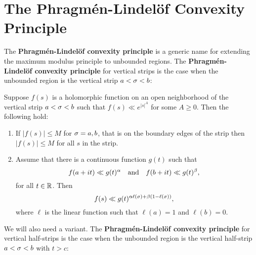   \section{The Phragm\'en-Lindel\"of Convexity Principle}\label{append:The_Phragmen_Lindelof_Convexity_principle}
    The \textbf{Phragm\'en-Lindel\"of convexity principle} is a generic name for extending the maximum modulus principle to unbounded regions. The \textbf{Phragm\'en-Lindel\"of convexity principle} for vertical strips is the case when the unbounded region is the vertical strip $a < \sigma < b$:

    \begin{theorem*}\label{thm:Phragmen-Lindelof_convexity_principle}
      Suppose $f(s)$ is a holomorphic function on an open neighborhood of the vertical strip $a < \sigma < b$ such that $f(s) \ll e^{|s|^{A}}$ for some $A \ge 0$. Then the following hold:
      \begin{enumerate}[label=(\roman*)]
        \item If $|f(s)| \le M$ for $\sigma = a,b$, that is on the boundary edges of the strip then $|f(s)| \le M$ for all $s$ in the strip.
        \item Assume that there is a continuous function $g(t)$ such that
        \[
          f(a+it) \ll g(t)^{\alpha} \quad \text{and} \quad f(b+it) \ll g(t)^{\beta},
        \]
        for all $t \in \mathbb{R}$. Then
        \[
          f(s) \ll g(t)^{\alpha\ell(\sigma)+\beta(1-\ell(\sigma))},
        \]
        where $\ell$ is the linear function such that $\ell(a) = 1$ and $\ell(b) = 0$.
      \end{enumerate}
    \end{theorem*}

    We will also need a variant. The \textbf{Phragm\'en-Lindel\"of convexity principle} for vertical half-strips is the case when the unbounded region is the vertical half-strip $a < \sigma < b$ with $t > c$:


